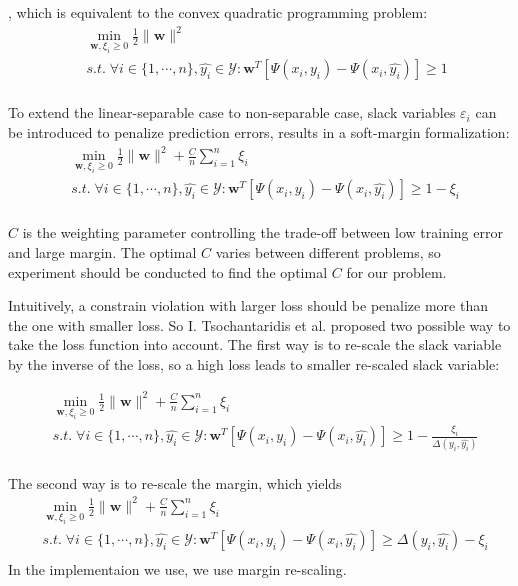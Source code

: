 , which is equivalent to the convex quadratic programming problem:
$$
\begin{aligned}
   & \min_{\mathbf{w}, \xi_i \geq 0} \frac{1}{2}\|\mathbf{w}\|^2 \\\
    &s.t.\; \forall i \in \{1,\cdots,n\},\hat{y_i} \in \mathcal{Y}: \mathbf{w}^T[\Psi(x_i,y_i) - \Psi(x_i,\hat{y_i})] \geq 1\\
\end{aligned}
$$

To extend the linear-separable case to non-separable case, slack variables $\varepsilon_i$ can be introduced to penalize prediction errors, results in a soft-margin formalization:
$$
\begin{aligned}
   & \min_{\mathbf{w}, \xi_i \geq 0} \frac{1}{2}\|\mathbf{w}\|^2 + \frac{C}{n}\sum^n_{i=1}\xi_i\\
    &s.t.\; \forall i \in \{1,\cdots,n\},\hat{y_i} \in \mathcal{Y}: \mathbf{w}^T[\Psi(x_i,y_i) - \Psi(x_i,\hat{y_i})] \geq 1 - \xi_i \\
\end{aligned}
$$

$C$ is the weighting parameter controlling the trade-off between low training error and large margin. The optimal $C$ varies between different problems, so experiment should be conducted to find the optimal $C$ for our problem.

Intuitively, a constrain violation with larger loss should be penalize more than the one with smaller loss. So I. Tsochantaridis et al. \cite{svm2005} proposed two possible way to take the loss function into account. The first way is to re-scale the slack variable by the inverse of the loss, so a high loss leads to smaller re-scaled slack variable:

$$
\begin{aligned}
   & \min_{\mathbf{w}, \xi_i \geq 0} \frac{1}{2}\|\mathbf{w}\|^2 + \frac{C}{n} \sum^n_{i=1}\xi_i\\
    &s.t.\; \forall i \in \{1,\cdots,n\},\hat{y_i} \in \mathcal{Y}: \mathbf{w}^T[\Psi(x_i,y_i) - \Psi(x_i,\hat{y_i})] \geq 1 - \frac{\xi_i}{\Delta(y_i, \hat{y_i})} \\
\end{aligned}
$$

The second way is to re-scale the margin, which yields 
$$
\begin{aligned}
   & \min_{\mathbf{w}, \xi_i \geq 0} \frac{1}{2}\|\mathbf{w}\|^2  + \frac{C}{n} \sum^n_{i=1}\xi_i\\
    &s.t.\; \forall i \in \{1,\cdots,n\},\hat{y_i} \in \mathcal{Y}: \mathbf{w}^T[\Psi(x_i,y_i) - \Psi(x_i,\hat{y_i})] \geq \Delta(y_i, \hat{y_i}) - \xi_i\\
%
\end{aligned}
$$
In the implementaion we use, we use margin re-scaling.

